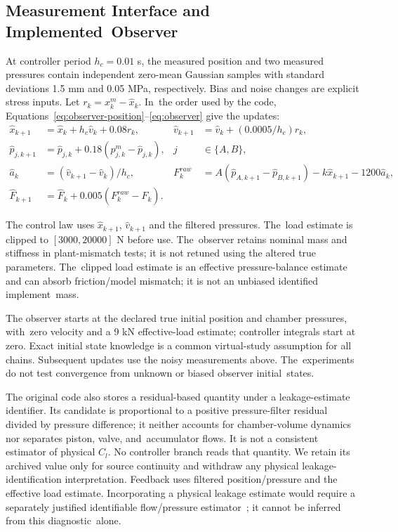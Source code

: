 \documentclass[machines,article,submit,pdftex,moreauthors]{Definitions/mdpi}
\begin{document}
\subsection{Measurement Interface and Implemented~Observer}
At controller period $h_c=0.01$ s, the measured position and two measured pressures contain independent zero-mean Gaussian samples with standard deviations 1.5 mm and 0.05 MPa, respectively. Bias and noise changes are explicit stress inputs. Let $r_k=x^m_k-\hat x_k$. In~the order used by the code, Equations~\eqref{eq:observer-position}--\eqref{eq:observer} give the updates:
\begin{align}
\hat x_{k+1}&=\hat x_k+h_c\hat v_k+0.08r_k,&
\hat v_{k+1}&=\hat v_k+(0.0005/h_c)r_k,\label{eq:observer-position}\\
\hat p_{j,k+1}&=\hat p_{j,k}+0.18(p^m_{j,k}-\hat p_{j,k}),&j&\in\{A,B\},\label{eq:observer-pressure}\\
\hat a_k&=(\hat v_{k+1}-\hat v_k)/h_c,&
F_k^{raw}&=A(\hat p_{A,k+1}-\hat p_{B,k+1})-k\hat x_{k+1}-1200\hat a_k,\label{eq:observer-load}\\
\hat F_{k+1}&=\hat F_k+0.005(F_k^{raw}-\hat F_k).
\label{eq:observer}
\end{align}

The control law uses $\hat x_{k+1}$, $\hat v_{k+1}$ and the filtered pressures. The~load estimate is clipped to $[3000,20000]$ N before use. The~observer retains nominal mass and stiffness in plant-mismatch tests; it is not retuned using the altered true parameters. The~clipped load estimate is an effective pressure-balance estimate and can absorb friction/model mismatch; it is not an unbiased identified implement~mass.

The observer starts at the declared true initial position and chamber pressures, with~zero velocity and a 9 kN effective-load estimate; controller integrals start at zero. Exact initial state knowledge is a common virtual-study assumption for all chains. Subsequent updates use the noisy measurements above. The~experiments do not test convergence from unknown or biased observer initial~states.

The original code also stores a residual-based quantity under a leakage-estimate identifier. Its candidate is proportional to a positive pressure-filter residual divided by pressure difference; it neither accounts for chamber-volume dynamics nor separates piston, valve, and~accumulator flows. It is not a consistent estimator of physical $C_l$. No controller branch reads that quantity. We retain its archived value only for source continuity and withdraw any physical leakage-identification interpretation. Feedback uses filtered position/pressure and the effective load estimate. Incorporating a physical leakage estimate would require a separately justified identifiable flow/pressure estimator~\cite{an2005}; it cannot be inferred from this diagnostic~alone.
\end{document}
